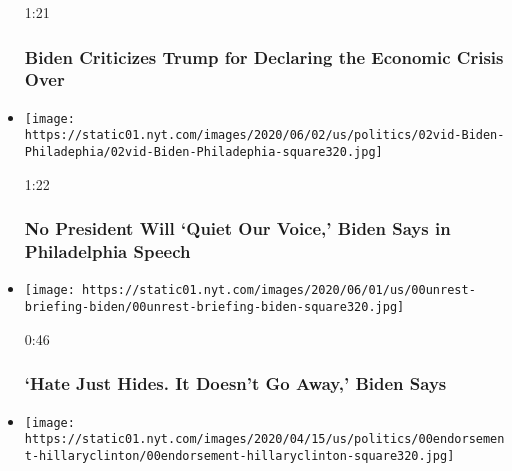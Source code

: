 \begin{itemize}
  1:21

  \hypertarget{biden-criticizes-trump-for-declaring-the-economic-crisis-over}{%
  \subsubsection{Biden Criticizes Trump for Declaring the Economic
  Crisis
  Over}\label{biden-criticizes-trump-for-declaring-the-economic-crisis-over}}
\item
  \href{https://www.nytimes.com/video/us/elections/100000007169461/watch-live-biden-visits-philadelphia.html?action=click\&module=video-series-bar\&region=header\&pgtype=Article\&playlistId=video/2020-Elections}{}

  \texttt{[image: https://static01.nyt.com/images/2020/06/02/us/politics/02vid-Biden-Philadephia/02vid-Biden-Philadephia-square320.jpg]}

  1:22

  \hypertarget{no-president-will-quiet-our-voice-biden-says-in-philadelphia-speech}{%
  \subsubsection{No President Will `Quiet Our Voice,' Biden Says in
  Philadelphia
  Speech}\label{no-president-will-quiet-our-voice-biden-says-in-philadelphia-speech}}
\item
  \href{https://www.nytimes.com/video/us/elections/100000007168118/hate-just-hides-it-doesnt-go-away-biden-says.html?action=click\&module=video-series-bar\&region=header\&pgtype=Article\&playlistId=video/2020-Elections}{}

  \texttt{[image: https://static01.nyt.com/images/2020/06/01/us/00unrest-briefing-biden/00unrest-briefing-biden-square320.jpg]}

  0:46

  \hypertarget{hate-just-hides-it-doesnt-go-away-biden-says}{%
  \subsubsection{`Hate Just Hides. It Doesn't Go Away,' Biden
  Says}\label{hate-just-hides-it-doesnt-go-away-biden-says}}
\item
  \href{https://www.nytimes.com/video/us/politics/100000007111258/watch-live-hillary-clinton-endorses-biden.html?action=click\&module=video-series-bar\&region=header\&pgtype=Article\&playlistId=video/2020-Elections}{}

  \texttt{[image: https://static01.nyt.com/images/2020/04/15/us/politics/00endorsement-hillaryclinton/00endorsement-hillaryclinton-square320.jpg]}


\end{itemize}
